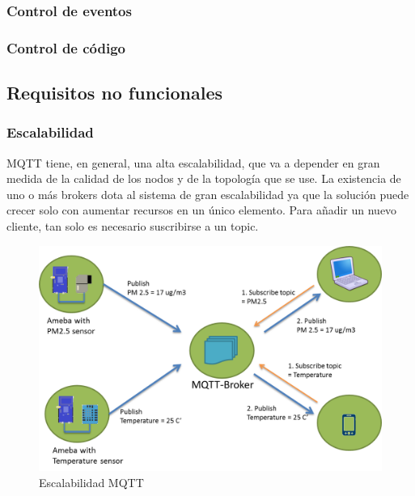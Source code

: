 \documentclass[12pt, twoside]{book}
\begin{document}
\subsubsection*{Control de eventos}

\subsubsection*{Control de código}

\subsection{Requisitos no funcionales}
\subsubsection*{Escalabilidad}
MQTT tiene, en general, una alta escalabilidad, que va a depender en gran medida de la calidad de los nodos y de la topología que se use. La existencia de uno o más brokers dota al sistema de gran escalabilidad ya que la solución puede crecer solo con aumentar recursos en un único elemento.
Para añadir un nuevo cliente, tan solo es necesario suscribirse a un topic.
\begin{figure}[h!]
\centering
\includegraphics[scale=0.3]{images/figure3.png}
\caption{Escalabilidad MQTT}\label{L403}
\end{figure}
\end{document}
